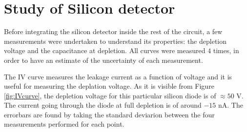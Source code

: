 \documentclass[12pt]{article}
\begin{document}




%
%


\section{Study of Silicon detector}

Before integrating the silicon detector inside the rest of the circuit, a few measurements were undertaken to understand its properties: the depletion voltage and the capacitance at depletion. All curves were measured $4$ times, in order to have an estimate of the uncertainty of each measurement.

The IV curve measures the leakage current as a function of voltage and it is useful for measuring the deplation voltage. As it is visible from Figure \ref{fig:IVcurve}, the depletion voltage for this particular silicon diode is of $\approx 50$ V. The current going through the diode at full depletion is of around $-15$ nA. The errorbars are found by taking the standard deviarion between the four measurements performed for each point.
\end{document}
